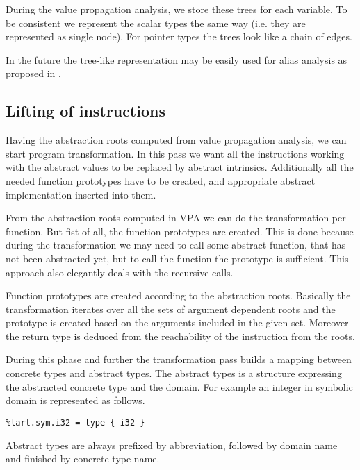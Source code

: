 During the value propagation analysis, we store these trees for each variable.
To be consistent we represent the scalar types the same way (i.e. they are
represented as single node). For pointer types the trees look like a chain of
 edges.

In the future the tree-like representation may be easily used for alias analysis as proposed
in \cite{Rockai15}.

\subsection{Lifting of instructions}
Having the abstraction roots computed from value propagation analysis, we can
start program transformation. In this \LLVM pass we want all the instructions
working with the abstract values to be replaced by abstract intrinsics.
Additionally all the needed function prototypes have to be created, and
appropriate abstract implementation inserted into them.

From the abstraction roots computed in VPA we can do the transformation per
function.  But fist of all, the function prototypes are created. This is done
because during the transformation we may need to call some abstract function,
that has not been abstracted yet, but to call the function the prototype is
sufficient.  This approach also elegantly deals with the recursive calls.

Function prototypes are created according to the abstraction roots. Basically
the transformation iterates over all the sets of argument dependent roots and
the prototype is created based on the arguments included in the given set.
Moreover the return type is deduced from the reachability of the  instruction
from the roots.

During this phase and further the transformation pass builds a mapping between
concrete types and abstract types. The abstract types is a \LLVM structure
expressing the abstracted concrete type and the domain. For example an integer
in symbolic domain is represented as follows.

\begin{verbatim}
%lart.sym.i32 = type { i32 }
\end{verbatim}

Abstract types are always prefixed by  abbreviation, followed by
domain name and finished by concrete \LLVM type name.

